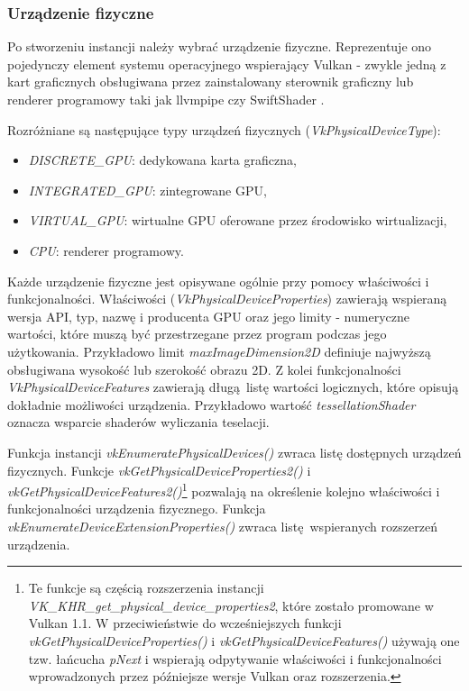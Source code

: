 \subsubsection{Urządzenie fizyczne}

Po stworzeniu instancji należy wybrać urządzenie fizyczne. Reprezentuje ono pojedynczy element systemu operacyjnego wspierający Vulkan - zwykle jedną z kart graficznych obsługiwana przez zainstalowany sterownik graficzny lub renderer programowy taki jak llvmpipe \cite{LLVMPIPE} czy SwiftShader \cite{SWIFTSHADER}.

Rozróżniane są następujące typy urządzeń fizycznych (\textit{VkPhysicalDeviceType}):
\begin{itemize}
	\item \textit{DISCRETE\_GPU}: dedykowana karta graficzna,
	\item \textit{INTEGRATED\_GPU}: zintegrowane GPU,
	\item \textit{VIRTUAL\_GPU}: wirtualne GPU oferowane przez środowisko wirtualizacji,
	\item \textit{CPU}: renderer programowy.
\end{itemize}

Każde urządzenie fizyczne jest opisywane ogólnie przy pomocy właściwości i funkcjonalności.
Właściwości (\textit{VkPhysicalDeviceProperties}) zawierają wspieraną wersja API, typ, nazwę i producenta GPU oraz jego limity - numeryczne wartości, które muszą być przestrzegane przez program podczas jego użytkowania. Przykładowo limit \textit{maxImageDimension2D} definiuje najwyższą obsługiwana wysokość lub szerokość obrazu 2D.
Z kolei funkcjonalności \textit{VkPhysicalDeviceFeatures} zawierają długą listę wartości logicznych, które opisują dokładnie możliwości urządzenia. Przykładowo wartość \textit{tessellationShader} oznacza wsparcie shaderów wyliczania teselacji.

Funkcja instancji \textit{vkEnumeratePhysicalDevices()} zwraca listę dostępnych urządzeń fizycznych.
Funkcje \textit{vkGetPhysicalDeviceProperties2()} i \textit{vkGetPhysicalDeviceFeatures2()}\footnote{Te funkcje są częścią rozszerzenia instancji \textit{VK\_KHR\_get\_physical\_device\_properties2}, które zostało promowane w Vulkan 1.1. W przeciwieństwie do wcześniejszych funkcji \textit{vkGetPhysicalDeviceProperties()} i \textit{vkGetPhysicalDeviceFeatures()} używają one tzw. łańcucha \textit{pNext} i wspierają odpytywanie właściwości i funkcjonalności wprowadzonych przez późniejsze wersje Vulkan oraz rozszerzenia.} pozwalają na określenie kolejno właściwości i funkcjonalności urządzenia fizycznego.
Funkcja \textit{vkEnumerateDeviceExtensionProperties()} zwraca listę wspieranych rozszerzeń urządzenia.

